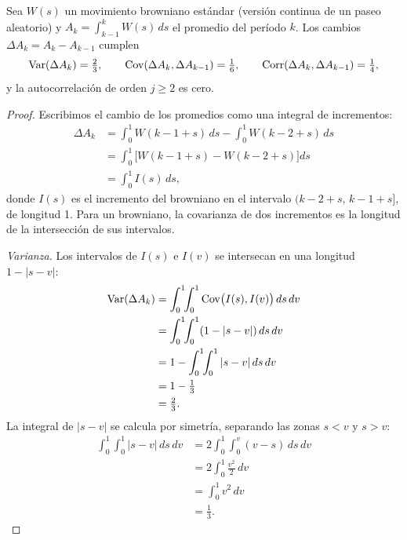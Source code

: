 \begin{proposicion}[Working, 1960]\label{prop:working}
Sea $W(s)$ un movimiento browniano estándar (versión continua de un paseo aleatorio) y
$A_k=\int_{k-1}^{k}W(s)\,ds$ el promedio del período $k$. Los cambios $\Delta A_k=A_k-A_{k-1}$ cumplen
\[
  \operatorname{Var}(\Delta A_k)=\tfrac23,\qquad \operatorname{Cov}(\Delta A_k,\Delta A_{k-1})=\tfrac16,\qquad
  \operatorname{Corr}(\Delta A_k,\Delta A_{k-1})=\tfrac14,
\]
y la autocorrelación de orden $j\ge2$ es cero.
\end{proposicion}

\begin{proof}
Escribimos el cambio de los promedios como una integral de incrementos:
\begin{align*}
  \Delta A_k &= \int_0^1W(k-1+s)\,ds-\int_0^1W(k-2+s)\,ds\\
             &= \int_0^1\bigl[W(k-1+s)-W(k-2+s)\bigr]ds\\
             &= \int_0^1I(s)\,ds,
\end{align*}
donde $I(s)$ es el incremento del browniano en el intervalo $(k-2+s,\,k-1+s]$, de longitud 1. Para un
browniano, la covarianza de dos incrementos es la longitud de la intersección de sus intervalos.

\emph{Varianza.} Los intervalos de $I(s)$ e $I(v)$ se intersecan en una longitud $1-|s-v|$:
\begin{align*}
  \operatorname{Var}(\Delta A_k) &= \int_0^1\!\!\int_0^1\operatorname{Cov}\bigl(I(s),I(v)\bigr)\,ds\,dv\\
                   &= \int_0^1\!\!\int_0^1(1-|s-v|)\,ds\,dv\\
                   &= 1-\int_0^1\!\!\int_0^1|s-v|\,ds\,dv\\
                   &= 1-\tfrac13\\
                   &= \tfrac23 .
\end{align*}
La integral de $|s-v|$ se calcula por simetría, separando las zonas $s<v$ y $s>v$:
\begin{align*}
  \int_0^1\!\!\int_0^1|s-v|\,ds\,dv &= 2\int_0^1\!\!\int_0^v(v-s)\,ds\,dv\\
                                    &= 2\int_0^1\frac{v^2}{2}\,dv\\
                                    &= \int_0^1v^2\,dv\\
                                    &= \tfrac13 .
\end{align*}


\end{proof}
